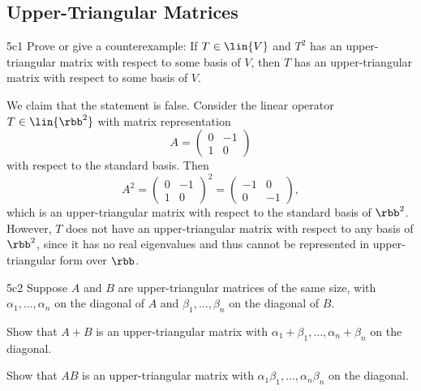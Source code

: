 \subsection{Upper-Triangular Matrices}

\begin{exercise}{5c1}
    Prove or give a counterexample: If $T \in \lin{V}$ and $T^2$ has an upper-triangular matrix with respect to some basis of $V$, then $T$ has an upper-triangular matrix with respect to some basis of $V$.

\end{exercise}

\begin{sol}
    We claim that the statement is false. 
    Consider the linear operator $T \in \lin{\rbb^2}$ with matrix representation
    \[
        A = 
        \begin{pmatrix}
            0 & -1 \\
            1 & 0
        \end{pmatrix}
    \]
    with respect to the standard basis.
    Then
    \[
        A^2 = 
        \begin{pmatrix}
            0 & -1 \\
            1 & 0
        \end{pmatrix}^2 = 
        \begin{pmatrix}
            -1 & 0 \\
            0 & -1
        \end{pmatrix},
    \]
    which is an upper-triangular matrix with respect to the standard basis of $\rbb^2$. 
    However, $T$ does not have an upper-triangular matrix with respect to any basis of $\rbb^2$, since it has no real eigenvalues and thus cannot be represented in upper-triangular form over $\rbb$.
\end{sol}

\begin{exercise}{5c2}
    Suppose $A$ and $B$ are upper-triangular matrices of the same size, with $\alpha_1, \ldots, \alpha_n$ on the diagonal of $A$ and $\beta_1, \ldots, \beta_n$ on the diagonal of $B$.
    \begin{subexercises}
        \item Show that $A + B$ is an upper-triangular matrix with $\alpha_1 + \beta_1, \ldots, \alpha_n + \beta_n$ on the diagonal.
        \item Show that $AB$ is an upper-triangular matrix with $\alpha_1\beta_1, \ldots, \alpha_n\beta_n$ on the diagonal.
    \end{subexercises}
\end{exercise}

